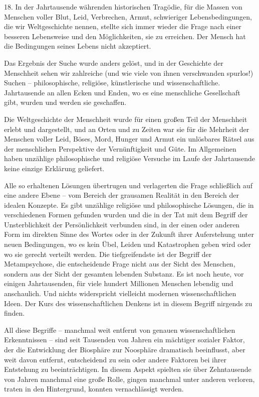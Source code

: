 \documentclass[11pt,a4paper]{book}
\begin{document}
18. In der Jahrtausende währenden historischen Tragödie, für die Massen von Menschen voller Blut, Leid, Verbrechen, Armut, schwieriger Lebensbedingungen, die wir Weltgeschichte nennen, stellte sich immer wieder die Frage nach einer besseren Lebensweise und den Möglichkeiten, sie zu erreichen. Der Mensch hat die Bedingungen seines Lebens nicht akzeptiert. 

Das Ergebnis der Suche wurde anders gelöst, und in der Geschichte der Menschheit sehen wir zahlreiche (und wie viele von ihnen verschwanden spurlos!) Suchen -- philosophische, religiöse, künstlerische und wissenschaftliche. Jahrtausende an allen Ecken und Enden, wo es eine menschliche Gesellschaft gibt, wurden und werden sie geschaffen. 

Die Weltgeschichte der Menschheit wurde für einen großen Teil der Menschheit erlebt und dargestellt, und an Orten und zu Zeiten war sie für die Mehrheit der Menschen voller Leid, Böses, Mord, Hunger und Armut ein unlösbares Rätsel aus der menschlichen Perspektive der Vernünftigkeit und Güte. Im Allgemeinen haben unzählige philosophische und religiöse Versuche im Laufe der Jahrtausende keine einzige Erklärung geliefert. 

Alle so erhaltenen Lösungen übertrugen und verlagerten die Frage schließlich auf eine andere Ebene -- vom Bereich der grausamen Realität in den Bereich der idealen Konzepte. Es gibt unzählige religiöse und philosophische Lösungen, die in verschiedenen Formen gefunden wurden und die in der Tat mit dem Begriff der Unsterblichkeit der Persönlichkeit verbunden sind, in der einen oder anderen Form im direkten Sinne des Wortes oder in der Zukunft ihrer Auferstehung unter neuen Bedingungen, wo es kein Übel, Leiden und Katastrophen geben wird oder wo sie gerecht verteilt werden. Die tiefgreifendste ist der Begriff der Metampsychose, die entscheidende Frage nicht aus der Sicht des Menschen, sondern aus der Sicht der gesamten lebenden Substanz. Es ist noch heute, vor einigen Jahrtausenden, für viele hundert Millionen Menschen lebendig und anschaulich. Und nichts widerspricht vielleicht modernen wissenschaftlichen Ideen. Der Kurs des wissenschaftlichen Denkens ist in diesem Begriff nirgends zu finden. 

All diese Begriffe -- manchmal weit entfernt von genauen wissenschaftlichen Erkenntnissen -- sind seit Tausenden von Jahren ein mächtiger sozialer Faktor, der die Entwicklung der Biosphäre zur Noosphäre dramatisch beeinflusst, aber weit davon entfernt, entscheidend zu sein oder andere Faktoren bei ihrer Entstehung zu beeinträchtigen. In diesem Aspekt spielten sie über Zehntausende von Jahren manchmal eine große Rolle, gingen manchmal unter anderen verloren, traten in den Hintergrund, konnten vernachlässigt werden. 
\end{document}
